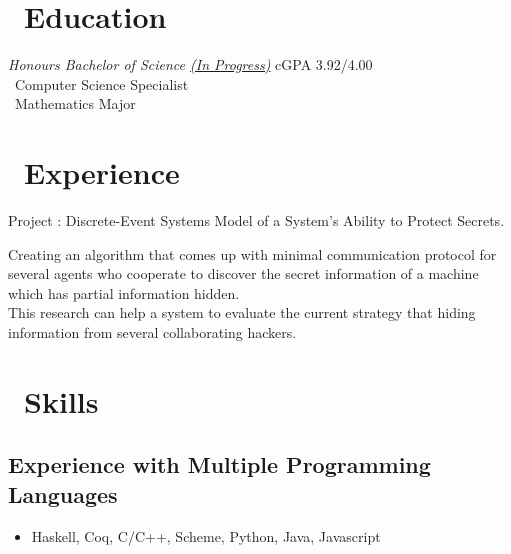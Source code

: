\documentclass{resume}
\begin{document}




\section{\faGraduationCap\ Education}
\textit{Honours Bachelor of Science \underline{(In Progress)}}  \hfill cGPA 3.92/4.00
\\ \textperiodcentered\  Computer Science Specialist 
\\ \textperiodcentered\  Mathematics Major

\section{\faUsers\ Experience}
 {}
Project : Discrete-Event Systems Model of a System's Ability to Protect Secrets.

Creating an algorithm that comes up with minimal communication protocol 
for several agents who cooperate to discover the secret information of a machine 
which has partial information hidden. \\
This research can help a system to evaluate the current strategy 
that hiding information from several collaborating hackers.





\section{\faCogs\ Skills}
\subsection{\textbf{Experience with Multiple Programming Languages}}
\begin{itemize}
 \item Haskell, Coq, C/C++, Scheme, Python, Java, Javascript
\end{itemize}
\end{document}
